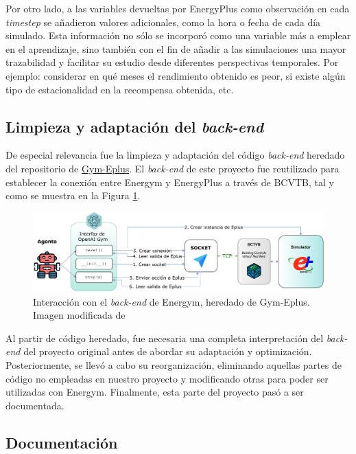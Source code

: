 Por otro lado, a las variables devueltas por EnergyPlus como observación en cada \textit{timestep} se añadieron valores adicionales, como la hora o fecha de cada día simulado. Esta información no sólo se incorporó como una variable más a emplear en el aprendizaje, sino también con el fin de añadir a las simulaciones una mayor trazabilidad y facilitar su estudio desde diferentes perspectivas temporales. Por ejemplo: considerar en qué meses el rendimiento obtenido es peor, si existe algún tipo de estacionalidad en la recompensa obtenida, etc.
    
\subsection{Limpieza y adaptación del \textit{back-end}}

De especial relevancia fue la limpieza y adaptación del código \textit{back-end} heredado del repositorio de \href{https://github.com/zhangzhizza/Gym-Eplus}{Gym-Eplus}. El \textit{back-end} de este proyecto fue reutilizado para establecer la conexión entre Energym y EnergyPlus a través de BCVTB, tal y como se muestra en la Figura \ref{fig:backend}.
    
\begin{figure}
    \centering
    \includegraphics[width=\textwidth]{imagenes/backend.pdf}
    \caption{Interacción con el \textit{back-end} de Energym, heredado de Gym-Eplus. Imagen modificada de \cite{zhang2019whole}}
    \label{fig:backend}
\end{figure}

Al partir de código heredado, fue necesaria una completa interpretación del \textit{back-end} del proyecto original antes de abordar su adaptación y optimización. Posteriormente, se llevó a cabo su reorganización, eliminando aquellas partes de código no empleadas en nuestro proyecto y modificando otras para poder ser utilizadas con Energym. Finalmente, esta parte del proyecto pasó a ser documentada.

\subsection{Documentación}

